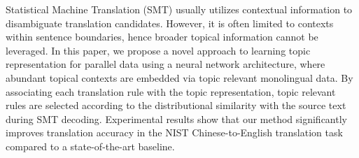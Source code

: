 Statistical Machine Translation (SMT) usually utilizes contextual information to disambiguate translation candidates. However, it is often limited to contexts within sentence boundaries, hence broader topical information cannot be leveraged.  In this paper, we propose a novel approach to learning topic representation for parallel data using a neural network architecture, where abundant topical contexts are embedded via topic relevant monolingual data. By associating each translation rule with the topic representation, topic relevant rules are selected according to the distributional similarity with the source text during SMT decoding. Experimental results show that our method significantly improves translation accuracy in the NIST Chinese-to-English translation task compared to a state-of-the-art baseline.
